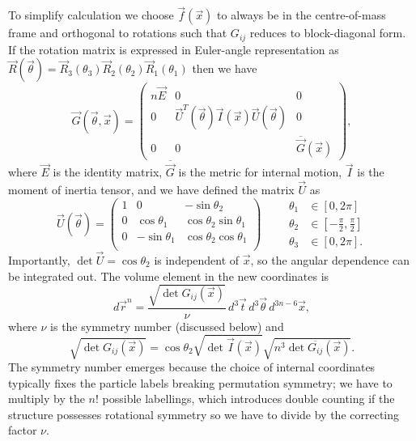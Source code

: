 \documentclass[11pt,twoside]{report}
\begin{document}
To simplify calculation we choose $\vec{f}(\vec{x})$ to always be in the centre-of-mass frame and orthogonal to rotations such that $G_{ij}$ reduces to block-diagonal form.
If the rotation matrix is expressed in Euler-angle representation as $\vec{R}(\vec{\theta}) = \vec{R}_3(\theta_3) \vec{R}_2(\theta_2) \vec{R}_1(\theta_1)$ then we have
\begin{equation}
  \vec{G}(\vec{\theta}, \vec{x})
  =
  \begin{pmatrix}
    n \vec{E} & 0 & 0 \\
    0 & \vec{U}^T(\vec{\theta}) \vec{I}(\vec{x}) \vec{U}(\vec{\theta}) & 0 \\
    0 & 0 & \overline{\vec{G}}(\vec{x})
  \end{pmatrix},
\end{equation}
where $\vec{E}$ is the identity matrix, $\overline{\vec{G}}$ is the metric for internal motion, $\vec{I}$ is the moment of inertia tensor, and we have defined the matrix $\vec{U}$ as
\begin{equation}
  \vec{U}(\vec{\theta})
  =
  \begin{pmatrix}
    1 &  0              & -\sin{\theta_2} \\
    0 &  \cos{\theta_1} &  \cos{\theta_2} \sin{\theta_1} \\
    0 & -\sin{\theta_1} &  \cos{\theta_2} \cos{\theta_1} \\
  \end{pmatrix}
  \qquad
  \begin{aligned}
    \theta_1 &\in [0,2\pi] \\
    \theta_2 &\in \left[-\frac{\pi}{2},\frac{\pi}{2}\right] \\
    \theta_3 &\in [0,2\pi].
  \end{aligned}
\end{equation}
Importantly, $\det{\vec{U}} = \cos{\theta_2}$ is independent of $\vec{x}$, so the angular dependence can be integrated out.
The volume element in the new coordinates is
\begin{equation}
  d\vec{r}^n
  =
  \frac{\sqrt{\det G_{ij}(\vec{x})}}{\nu}
  \, d^3 \vec{t} \, d^3 \vec{\theta} \, d^{3n-6} \vec{x},
\end{equation}
where $\nu$ is the symmetry number (discussed below) and
\begin{equation}
  \sqrt{\det G_{ij}(\vec{x})}
  =
  \cos{\theta_2} \sqrt{\det{\vec{I}(\vec{x})}}
  \sqrt{n^3 \det{\overline{G_{ij}}(\vec{x})}}.
\end{equation}
The symmetry number emerges because the choice of internal coordinates typically fixes the particle labels breaking permutation symmetry; we have to multiply by the $n!$ possible labellings, which introduces double counting if the structure possesses rotational symmetry so we have to divide by the correcting factor $\nu$.
\end{document}
